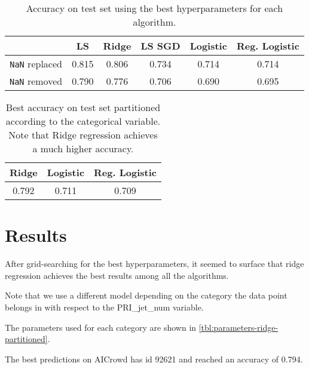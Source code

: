 \documentclass[10pt,conference,compsocconf]{IEEEtran}
\begin{document}
\begin{table}
  \begin{tabular}{ |c|c|c|c|c|c| } 
    \hline
     & LS & Ridge & LS SGD & Logistic & Reg. Logistic \\
    \hline
    \texttt{NaN} replaced & 0.815 & 0.806 & 0.734 & 0.714 & 0.714 \\
    \texttt{NaN} removed  & 0.790 & 0.776 & 0.706 & 0.690 & 0.695 \\
    \hline
  \end{tabular}

  \caption{Accuracy on test set using the best hyperparameters for each algorithm.}
  \label{tbl:test-accuracies}
\end{table}


\begin{table}
  \centering
  \begin{tabular}{ |c|c|c| } 
    \hline
    Ridge & Logistic & Reg. Logistic \\
    \hline
    0.792 & 0.711    & 0.709 \\
    \hline
  \end{tabular}
  \caption{Best accuracy on test set partitioned according to the categorical variable. Note that Ridge regression achieves a much higher accuracy.}
  \label{tbl:test-accuracies-partitioned}
\end{table}




\section{Results}

After grid-searching for the best hyperparameters, it seemed to surface
that ridge regression achieves the best results among all the algorithms.

Note that we use a different model depending on the category the data
point belongs in with respect to the \textsf{PRI\_jet\_num} variable.

The parameters used for each category are shown in \autoref{tbl:parameters-ridge-partitioned}.

The best predictions on AICrowd has id 92621 and reached an accuracy of 0.794.
\end{document}
